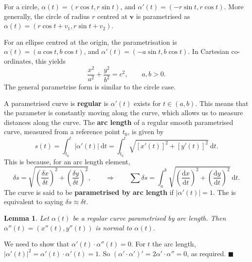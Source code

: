 \documentclass[letter-paper]{tufte-book}
\newtheorem{lemma}[theorem]{\color{pastel-blue}Lemma}
\newenvironment{proof}[1][Proof]{\begin{trivlist}
\item[\hskip \labelsep {\bfseries #1}]}{\end{trivlist}}
\newenvironment{example}[1][Example]{\begin{trivlist}
\item[\hskip \labelsep {\bfseries #1}]}{\end{trivlist}}
\newcommand{\vb}{\boldsymbol{v}}
\newcommand\Def[1]{\textbf{#1}}
\newcommand{\qed}{\hfill$\blacksquare$}
\begin{document}
\begin{example}
	For a circle, $\alpha(t)=(r\cos t,r\sin t)$, and $\alpha'(t)=(-r\sin t,r\cos
	t)$. More generally, the circle of radius $r$ centred at $\vb$ is
	parametrised as $\alpha(t)=(r\cos t + v_1, r\sin t + v_2)$.
	
	For an ellipse centred at the origin, the parametrisation is
	$\alpha(t)=(a\cos t, b\cos t)$, and $\alpha'(t)=(-a\sin t, b\cos t)$. In
	Cartesian co-ordinates, this yields
	\begin{equation*}
		\frac{x^2}{a^2} + \frac{y^2}{b^2} = c^2,\qquad a,b>0.
	\end{equation*}
	The general parametrise form is similar to the circle case.
\end{example}

A parametrised curve is \Def{regular} is $\alpha'(t)$ exists for
$t\in(a,b)$. This means that the parameter is constantly moving along the curve,
which allows us to measure distances along the curve. The \Def{arc length}
of a regular smooth parametrised curve, measured from a reference point $t_0$,
is given by
\begin{equation}
	s(t)=\int_{t_0}^t |\alpha'(t)|\ \mathrm{d}t = \int_{t_0}^{t}
	\sqrt{[x'(t)]^2+[y'(t)]^2}\ \mathrm{d}t.
\end{equation}
This is because, for an arc length element,
\begin{equation*}
	\delta s=\sqrt{\left(\frac{\delta x}{\delta t}\right)^2 +
	\left(\frac{\delta y}{\delta t}\right)^2},\qquad\Rightarrow\qquad
	\sum\delta s=\int_a^b\sqrt{\left(\frac{\mathrm{d} x}{\mathrm{d} t}\right)^2 
	+\left(\frac{\mathrm{d} y}{\mathrm{d} t}\right)^2}\ \mathrm{d}t.
\end{equation*}
The curve is said to be \Def{parametrised by arc length} if
$|\alpha'(t)|=1$. The is equivalent to saying $\delta s\approx\delta t$.

\begin{lemma}
	Let $\alpha(t)$ be a regular curve parametrised by arc length. Then
	$\alpha''(t)=(x''(t), y''(t))$ is normal to $\alpha(t)$.
\end{lemma}
\begin{proof}
	We need to show that $\alpha'(t)\cdot\alpha''(t)=0$. For $t$ the arc length,
	$|\alpha'(t)|^2=\alpha'(t)\cdot\alpha'(t)=1$. So
	$(\alpha'\cdot\alpha')'=2\alpha'\cdot\alpha''=0$, as required. \qed
\end{proof}
\end{document}
